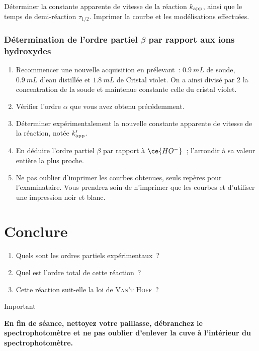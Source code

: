 \documentclass[a4paper, 11pt, final, garamond]{book}
\begin{document}
\medskip

Déterminer la constante apparente de vitesse de la réaction $k_{\rm app}$, ainsi
que le temps de demi-réaction $\tau_{1/2}$. Imprimer la courbe et les
modélisations effectuées. 

\subsubsection{Détermination de l'ordre partiel $\beta$ par rapport aux ions hydroxydes}

\begin{enumerate}
    \item Recommencer une nouvelle acquisition en prélevant~: $\SI{0,9}{mL}$ de
        soude, $\SI{0,9}{mL}$ d'eau distillée et $\SI{1,8}{mL}$ de Cristal
        violet. On a ainsi divisé par 2 la concentration de la soude et
        maintenue constante celle du cristal violet. 
    \item Vérifier l'ordre $\alpha$ que vous avez obtenu précédemment. 
    \item Déterminer expérimentalement la nouvelle constante apparente de
        vitesse de la réaction, notée $k_{\rm app}'$.
    \item En déduire l'ordre partiel $\beta$ par rapport à $\ce{HO^-}$~;
        l'arrondir à sa valeur entière la plus proche.
    \item Ne pas oublier d'imprimer les courbes obtenues, seuls repères pour
        l'examinataire. Vous prendrez soin de n'imprimer que les courbes et
        d'utiliser une impression noir et blanc.
\end{enumerate}

\section{Conclure}

\begin{enumerate}[label*=\protect\fbox{\arabic{enumi}}, start=9]
    \item Quels sont les ordres partiels expérimentaux~?
    \item Quel est l'ordre total de cette réaction~?
    \item Cette réaction suit-elle la loi de \textsc{Van't Hoff}~?
\end{enumerate}

\begin{NCror}[width=\linewidth]{Important}
    \begin{center}
        \bfseries
        En fin de séance, nettoyez votre paillasse, débranchez le
        spectrophotomètre et ne pas oublier d'enlever la cuve à l'intérieur du
        spectrophotomètre.
    \end{center}
\end{NCror}
\end{document}

